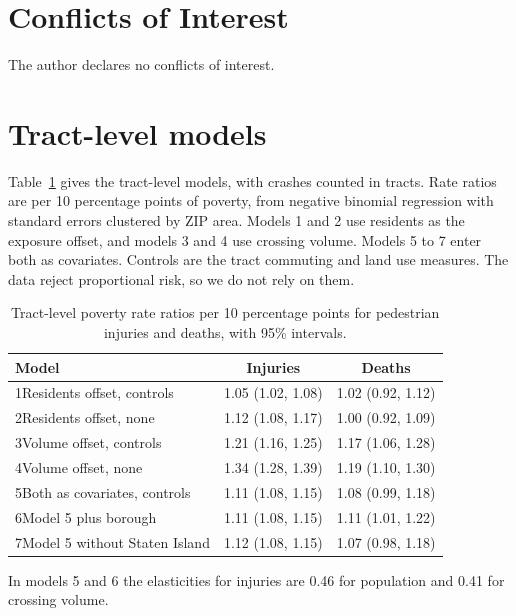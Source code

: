 \documentclass[10pt,twocolumn]{article}
\begin{document}
\section*{Conflicts of Interest}
The author declares no conflicts of interest.

\footnotesize



\appendix
\section{Tract-level models}
\label{app:tract}
Table~\ref{tab:tract} gives the tract-level models, with crashes counted in tracts. Rate ratios are per 10 percentage points of poverty, from negative binomial regression with standard errors clustered by ZIP area. Models 1 and 2 use residents as the exposure offset, and models 3 and 4 use crossing volume. Models 5 to 7 enter both as covariates. Controls are the tract commuting and land use measures. The data reject proportional risk, so we do not rely on them.

\begin{table}[!ht]
\centering
\caption{Tract-level poverty rate ratios per 10 percentage points for pedestrian injuries and deaths, with 95\% intervals.}
\label{tab:tract}
\footnotesize\setlength{\tabcolsep}{3pt}
\begin{tabular}{lcc}
\toprule
Model & Injuries & Deaths \\
\midrule
1\quad Residents offset, controls & 1.05 (1.02, 1.08) & 1.02 (0.92, 1.12) \\
2\quad Residents offset, none & 1.12 (1.08, 1.17) & 1.00 (0.92, 1.09) \\
3\quad Volume offset, controls & 1.21 (1.16, 1.25) & 1.17 (1.06, 1.28) \\
4\quad Volume offset, none & 1.34 (1.28, 1.39) & 1.19 (1.10, 1.30) \\
5\quad Both as covariates, controls & 1.11 (1.08, 1.15) & 1.08 (0.99, 1.18) \\
6\quad Model 5 plus borough & 1.11 (1.08, 1.15) & 1.11 (1.01, 1.22) \\
7\quad Model 5 without Staten Island & 1.12 (1.08, 1.15) & 1.07 (0.98, 1.18) \\
\bottomrule
\end{tabular}
\end{table}
In models 5 and 6 the elasticities for injuries are 0.46 for population and 0.41 for crossing volume.
\end{document}
